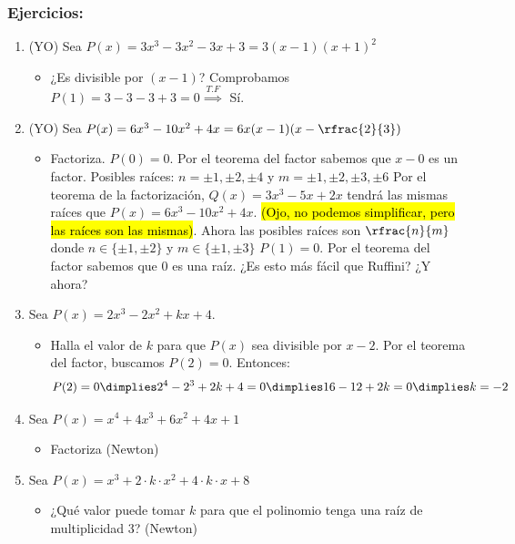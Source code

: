 \subsubsection{Ejercicios:}

\begin{enumerate}
\item (YO) Sea $P(x) = 3x^3-3x^2-3x+3 = 3(x-1)(x+1)^2$
\begin{itemize}
	\item ¿Es divisible por $(x-1)$? Comprobamos $P(1) = 3-3-3+3 = 0 \overset{T.F}{\implies}$ Sí.
\end{itemize}

\item (YO) Sea $P(x) = 6x^3-10x^2+4x = 6x(x-1)(x-\rfrac{2}{3})$ 
\begin{itemize}
	\item Factoriza.
	\subitem $P(0) = 0$. Por el teorema del factor sabemos que $x-0$ es un factor.
	\subitem Posibles raíces: $n=\pm1,\pm2,\pm4$ y $m=\pm1,\pm2,\pm3,\pm6$	
	\subitem Por el teorema de la factorización, $Q(x) = 3x^3-5x+2x$ tendrá las mismas raíces que $P(x) = 6x^3-10x^2+4x$. \hl{(Ojo, no podemos simplificar, pero las raíces son las mismas)}. Ahora las posibles raíces son $\rfrac{n}{m}$ donde $n\in\{\pm1,\pm2\}$ y $m\in\{\pm1,\pm3\}$
	\subitem $P(1) = 0$. Por el teorema del factor sabemos que $0$ es una raíz. ¿Es esto más fácil que Ruffini? ¿Y ahora?
\end{itemize}


\item Sea $P(x) = 2x^3-2x^2+kx+4$.
\begin{itemize}
	\item Halla el valor de $k$ para que $P(x)$ sea divisible por $x-2$.
	\subitem Por el teorema del factor, buscamos $P(2) = 0$. Entonces:
	\[
		P(2) = 0 \dimplies 2^4-2^3+2k+4 = 0 \dimplies 16-12+2k = 0 \dimplies k = -2
	\]
\end{itemize}


\item Sea $P(x) = x^4+4x^3+6x^2+4x+1$
\begin{itemize}
	\item Factoriza (Newton)
\end{itemize}


\item Sea $P(x) = x^3+2·k·x^2+4·k·x+8$
\begin{itemize}
	\item ¿Qué valor puede tomar $k$ para que el polinomio tenga una raíz de multiplicidad 3? (Newton)
\end{itemize}



\end{enumerate}
